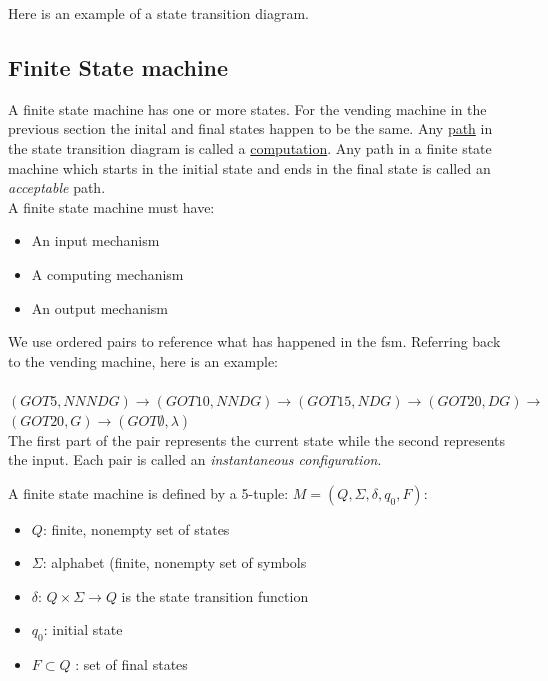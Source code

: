 \documentclass{scrartcl}
\begin{document}
Here is an example of a state transition diagram.

\subsection{Finite State machine}
A finite state machine has one or more states. For the vending machine in the previous section the inital and final states happen to be the same. Any \underline{path} in the state transition diagram is called a \underline{computation}. Any path in a finite state machine which starts in the initial state and ends in the final state is called an \emph{acceptable} path.\\

A finite state machine must have:
\begin{itemize}
\item An input mechanism
\item A computing mechanism
\item An output mechanism
\end{itemize}

We use ordered pairs to reference what has happened in the fsm. Referring back to the vending machine, here is an example:\\\\
$(GOT5,NNNDG)\rightarrow(GOT10,NNDG)\rightarrow(GOT15,NDG)\rightarrow(GOT20,DG)\rightarrow$\\
$(GOT20,G)\rightarrow(GOT\emptyset,\lambda)$\\

The first part of the pair represents the current state while the second represents the input. Each pair is called an \emph{instantaneous configuration}.

A finite state machine is defined by a 5-tuple: $M=(Q,\Sigma,\delta,q_0,F)$:
\begin{itemize}
\item $Q$: finite, nonempty set of states
\item $\Sigma$: alphabet (finite, nonempty set of symbols
\item $\delta$: $Q\times\Sigma\rightarrow Q$ is the state transition function
\item $q_0$: initial state
\item $F\subset Q$ : set of final states
\end{itemize}
\end{document}
